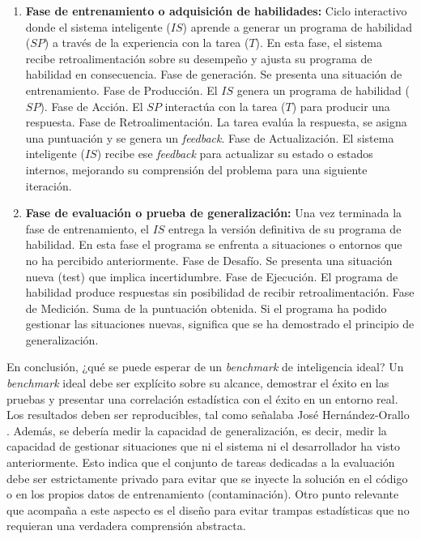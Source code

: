 \documentclass[11pt,a4paper,spanish]{book}
\numberwithin{equation}{chapter}
\numberwithin{figure}{chapter}
\begin{document}
\begin{enumerate}
\item \textbf{Fase de entrenamiento o adquisición de habilidades:} Ciclo interactivo donde el sistema inteligente ($IS$) aprende a generar un programa de habilidad ($SP$) a través de la experiencia con la tarea ($T$). En esta fase, el sistema recibe retroalimentación sobre su desempeño y ajusta su programa de habilidad en consecuencia.
	 Fase de generación. Se presenta una situación de entrenamiento.
	 Fase de Producción. El $IS$ genera un programa de habilidad ($SP$).
	 Fase de Acción. El $SP$ interactúa con la tarea ($T$) para producir una respuesta.
	 Fase de Retroalimentación. La tarea evalúa la respuesta, se asigna una puntuación y se genera un \textit{feedback}.
	 Fase de Actualización. El sistema inteligente ($IS$) recibe ese \textit{feedback} para actualizar su estado o estados internos, mejorando su comprensión del problema para una siguiente iteración.
\item \textbf{Fase de evaluación o prueba de generalización:} Una vez terminada la fase de entrenamiento, el $IS$ entrega la versión definitiva de su programa de habilidad. En esta fase el programa se enfrenta a situaciones o entornos que no ha percibido anteriormente.
	 Fase de Desafío. Se presenta una situación nueva (test) que implica incertidumbre.
	 Fase de Ejecución. El programa de habilidad produce respuestas sin posibilidad de recibir retroalimentación.
	 Fase de Medición. Suma de la puntuación obtenida. Si el programa ha podido gestionar las situaciones nuevas, significa que se ha demostrado el principio de generalización.
\end{enumerate}

En conclusión, ¿qué se puede esperar de un \textit{benchmark} de inteligencia ideal? Un \textit{benchmark} ideal debe ser explícito sobre su alcance, demostrar el éxito en las pruebas y presentar una correlación
estadística con el éxito en un entorno real. Los resultados deben ser reproducibles, tal como señalaba José Hernández-Orallo \citeyear{hernandez2017evaluation}. Además, se debería 
medir la capacidad de generalización, es decir, medir la capacidad de gestionar situaciones que ni el sistema ni el desarrollador ha visto anteriormente. Esto indica que el conjunto de tareas dedicadas
a la evaluación debe ser estrictamente privado para evitar que se inyecte la solución en el código o en los propios datos de entrenamiento (contaminación). Otro punto relevante que acompaña a
este aspecto es el diseño para evitar trampas estadísticas que no requieran una verdadera comprensión abstracta.
\end{document}
